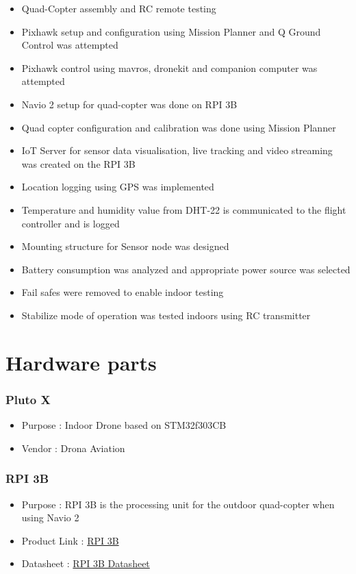 \documentclass[a4paper,12pt,oneside]{book}
\begin{document}
\begin{itemize}
\item Quad-Copter assembly and RC remote testing
\item Pixhawk setup and configuration using Mission Planner and Q Ground Control was attempted
\item Pixhawk control using mavros, dronekit and companion computer was attempted
\item Navio 2 setup for quad-copter was done on RPI 3B
\item Quad copter configuration and calibration was done using Mission Planner
\item IoT Server for sensor data visualisation, live tracking and video streaming was created on the RPI 3B
\item Location logging using GPS was implemented 
\item Temperature and humidity value from DHT-22 is communicated to the flight controller and is logged
\item Mounting structure for Sensor node was designed 
\item Battery consumption was analyzed and appropriate power source was selected
\item Fail safes were removed to enable indoor testing
\item Stabilize mode of operation was tested indoors using RC transmitter
\end{itemize}

\section{Hardware parts}

\subsubsection{Pluto X } 

\begin{itemize}
  \item Purpose : Indoor Drone based on STM32f303CB
  \item Vendor  : Drona Aviation 
 \end{itemize}
 
 \subsubsection{RPI 3B } 

\begin{itemize}
  \item Purpose : RPI 3B is the processing unit for the outdoor quad-copter when using Navio 2 
  \item Product Link : \href{https://www.raspberrypi.org/products/raspberry-pi-3-model-b/}{RPI 3B} 
  \item Datasheet : \href{https://cdn.sparkfun.com/datasheets/Dev/RaspberryPi/2020826.pdf}{RPI 3B Datasheet} 
 \end{itemize}
 
\end{document}
